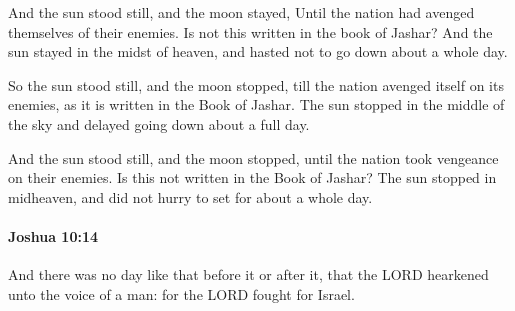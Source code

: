 			\begin{versebox}
					\item[BHS] 
					\item[ASV] And the sun stood still, and the moon stayed, Until the nation had avenged themselves of their enemies. Is not this written in the book of Jashar? And the sun stayed in the midst of heaven, and hasted not to go down about a whole day.
					\item[NIV] So the sun stood still, and the moon stopped, till the nation avenged itself on its enemies, as it is written in the Book of Jashar. The sun stopped in the middle of the sky and delayed going down about a full day.
					\item[NRSV] And the sun stood still, and the moon stopped, until the nation took vengeance on their enemies. Is this not written in the Book of Jashar? The sun stopped in midheaven, and did not hurry to set for about a whole day.
			\end{versebox}

		\paragraph{Joshua 10:14} %
			\label{JOSHUA-10-14}

			And there was no day like that before it or after it, that the LORD hearkened unto the voice of a man: for the LORD fought for Israel.

